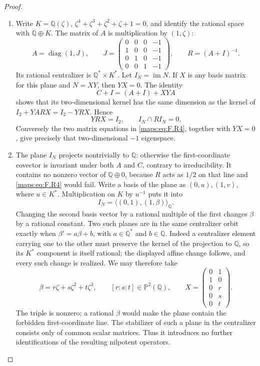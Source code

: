 \begin{proof}
\begin{enumerate}[label=\arabic*.]
\item Write $K=\mathbb Q(\zeta)$, $\zeta^4+\zeta^3+\zeta^2+
\zeta+1=0$, and identify the rational space with
$\mathbb Q\oplus K$.  The matrix of $A$ is multiplication by
$(1,\zeta)$:
\[
 A=\operatorname{diag}(1,J),\qquad
 J=\begin{pmatrix}
 0&0&0&-1\\1&0&0&-1\\0&1&0&-1\\0&0&1&-1
 \end{pmatrix},\qquad R=(A+I)^{-1}.
 \tag{F.R3}\label{maps:eq:F.R3}
\]
Its rational centralizer is $\mathbb Q^*\times K^*$.
Let $I_N=\operatorname{im}N$.  If $X$ is any basis matrix
for this plane and $N=XY$, then $YX=0$.
The identity
\[
 C+I=(A+I)+XYA
\]
shows that its two-dimensional kernel has the same dimension
as the kernel of
$I_2+YARX=I_2-YRX$.  Hence
\[
 YRX=I_2,
 \qquad I_N\cap RI_N=0.
 \tag{F.R4}\label{maps:eq:F.R4}
\]
Conversely the two matrix equations in \eqref{maps:eq:F.R4}, together with
$YX=0$, give precisely that two-dimensional $-1$ eigenspace.

\item The plane $I_N$ projects nontrivially to $\mathbb Q$:
otherwise the first-coordinate covector is invariant under
both $A$ and $C$, contrary to irreducibility.
It contains no nonzero vector of $\mathbb Q\oplus0$,
because $R$ acts as $1/2$ on that line and \eqref{maps:eq:F.R4} would fail.
Write a basis of the plane as $(0,u),(1,v)$, where
$u\in K^*$.  Multiplication on $K$ by $u^{-1}$ puts it into
\[
 I_N=\langle(0,1),(1,\beta)\rangle_{\mathbb Q}.
\]
Changing the second basis vector by a rational multiple of
the first changes $\beta$ by a rational constant.
Two such planes are in the same centralizer orbit exactly
when $\beta'=a\beta+b$, with $a\in\mathbb Q^*$ and
$b\in\mathbb Q$.  Indeed a centralizer element carrying
one to the other must preserve the kernel of the projection
to $\mathbb Q$, so its $K^*$ component is itself rational;
the displayed affine change follows, and every such change
is realized.  We may therefore take
\[
 \beta=r\zeta+s\zeta^2+t\zeta^3,
 \qquad [r:s:t]\in\mathbb P^2(\mathbb Q),
 \qquad
 X=\begin{pmatrix}0&1\\1&0\\0&r\\0&s\\0&t\end{pmatrix}.
 \tag{F.R5}\label{maps:eq:F.R5}
\]
The triple is nonzero; a rational $\beta$ would make the
plane contain the forbidden first-coordinate line.
The stabilizer of such a plane in the centralizer consists
only of common scalar matrices.  Thus it introduces no
further identifications of the resulting nilpotent operators.


\end{enumerate}
\end{proof}
